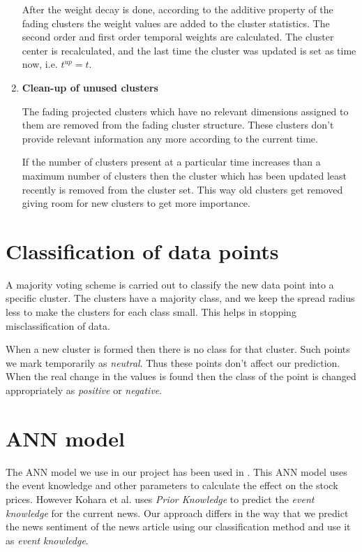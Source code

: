 \documentclass[a4paper,12bp]{report}
\begin{document}
\begin{enumerate}
After the weight decay is done, according to the additive property of the fading clusters the weight values are added to the cluster statistics. The second order and first order temporal weights are calculated. The cluster center is recalculated, and the last time the cluster was updated is set as time now, i.e. $t^{up} = t$.

\item \textbf{Clean-up of unused clusters}

The fading projected clusters which have no relevant dimensions assigned to them are removed from the fading cluster structure. These clusters don't provide relevant information any more according to the current time. 

If the number of clusters present at a particular time increases than a maximum number of clusters then the cluster which has been updated least recently is removed from the cluster set. This way old clusters get removed giving room for new clusters to get more importance. 
\end{enumerate}
\section{Classification of data points}

A majority voting scheme is carried out to classify the new data point into a specific cluster. The clusters have a majority class, and we keep the spread radius less to make the clusters for each class small. This helps in stopping misclassification of data.

When a new cluster is formed then there is no class for that cluster. Such points we mark temporarily as \textit{neutral}. Thus these points don't affect our prediction. When the real change in the values is found then the class of the point is changed appropriately as \textit{positive} or \textit{negative}.

\section{ANN model}
\label{sec:ann}
The ANN model we use in our project has been used in \cite{kohara:1997}. This ANN model uses the event knowledge and other parameters to calculate the effect on the stock prices. However Kohara et al. uses \textit{Prior Knowledge} to predict the \textit{event knowledge} for the current news. Our approach differs in the way that we predict the news sentiment of the news article using our classification method and use it as \textit{event knowledge}. 
\end{document}
